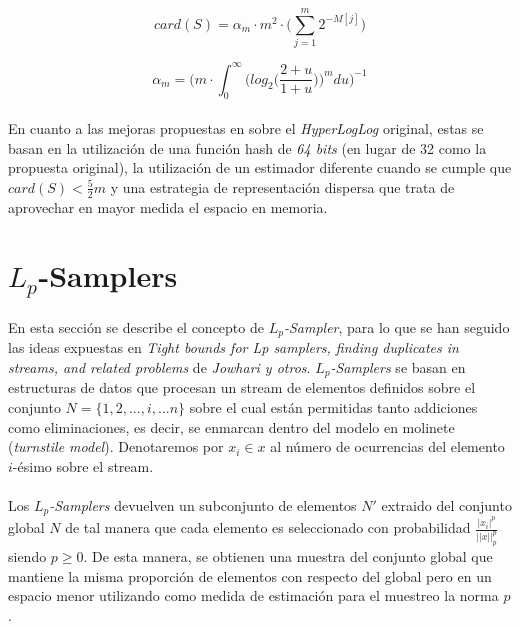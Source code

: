 \documentclass{subfiles}
\begin{document}
      \begin{equation}
      \label{eq:hyper_log_log_estimation}
        card(S) = \alpha_m \cdot m^2 \cdot \bigg( \sum_{j=1}^{m}2^{-M[j]}\bigg)
      \end{equation}

      \begin{equation}
      \label{eq:hyper_log_log_alpha}
        \alpha_m = \bigg(m \cdot \int_0^\infty \bigg(log_2\bigg(\frac{2+u}{1+u}\bigg)\bigg)^m du\bigg)^{-1}
      \end{equation}

      \paragraph{}
      En cuanto a las mejoras propuestas en \cite{heule2013hyperloglog} sobre el \emph{HyperLogLog} original, estas se basan en la utilización de una función hash de \emph{64 bits} (en lugar de 32 como la propuesta original), la utilización de un estimador diferente cuando se cumple que $card(S) < \frac{5}{2}m$ y una estrategia de representación dispersa que trata de aprovechar en mayor medida el espacio en memoria.

    \section{$L_p$-Samplers}
    \label{sec:lp_samplers}

      \paragraph{}
      En esta sección se describe el concepto de \emph{$L_p$-Sampler}, para lo que se han seguido las ideas expuestas en \emph{Tight bounds for Lp samplers, finding duplicates in streams, and related problems} \cite{jowhari2011tight} de \emph{Jowhari y otros}. \emph{$L_p$-Samplers} se basan en estructuras de datos que procesan un stream de elementos definidos sobre el conjunto $N= \{1, 2, ...,i, ...n\}$ sobre el cual están permitidas tanto addiciones como eliminaciones, es decir, se enmarcan dentro del modelo en molinete (\emph{turnstile model}). Denotaremos por $x_i \in x$ al número de ocurrencias del elemento $i$-ésimo sobre el stream.

      \paragraph{}
      Los \emph{$L_p$-Samplers} devuelven un subconjunto de elementos $N'$ extraido del conjunto global $N$ de tal manera que cada elemento es seleccionado con probabilidad $\frac{|x_i|^p}{||x||_p^p}$ siendo $p\geq0$. De esta manera, se obtienen una muestra del conjunto global que mantiene la misma proporción de elementos con respecto del global pero en un espacio menor utilizando como medida de estimación para el muestreo la norma $p$.
\end{document}
